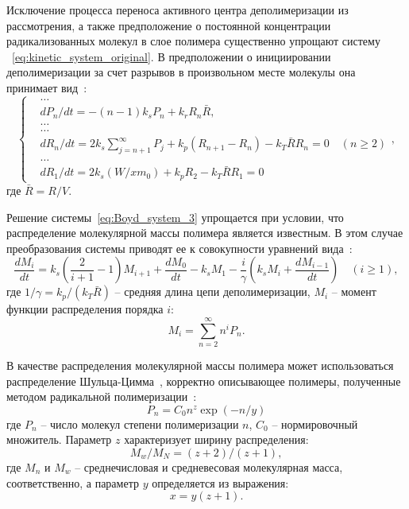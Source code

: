 Исключение процесса переноса активного центра деполимеризации из рассмотрения, а также предположение о постоянной концентрации радикализованных молекул в слое полимера существенно упрощают систему ~\ref{eq:kinetic_system_original}. В предположении о инициировании деполимеризации за счет разрывов в произвольном месте молекулы она принимает вид~\cite{Boyd_3}:
\begin{equation} \label{eq:Boyd_system_3}
	\left\{
	\begin{aligned}
		&\dots \\
		&d P_n / d t=-(n-1) k_s P_n+k_r R_n \bar{R}, \\
		&\dots \\
		&\dots \\
		&d R_n / d t=2 k_s \sum_{j=n+1}^{\infty} P_j+k_p\left(R_{n+1}-R_n\right)-k_T \bar{R} R_n=0 \quad(n \geq 2) \\
		&\dots \\
		&d R_1 / d t=2 k_s\left(W / x m_0\right)+k_p R_2-k_T \bar{R} R_1=0
	\end{aligned}
	\right.,
\end{equation}
где $\bar{R} = R/V$.

Решение системы~\ref{eq:Boyd_system_3} упрощается при условии, что распределение молекулярной массы полимера является известным. В этом случае преобразования системы приводят ее к совокупности уравнений вида~\cite{Boyd_3}:
\begin{equation} \label{eq:moment_equation}
	\frac{d M_i}{d t}=k_s\left(\frac{2}{i+1}-1\right) M_{i+1}+\frac{d M_0}{d t}-k_s M_1 - \frac{i}{\gamma}\left(k_s M_i+\frac{d M_{i-1}}{d t}\right) \quad(i \geq 1),
\end{equation}
где $1/\gamma = k_p / (k_T \bar{R})$ -- средняя длина цепи деполимеризации, $M_i$ -- момент функции распределения порядка $i$:
\begin{equation}
	M_i=\sum_{n=2}^{\infty} n^i P_n.
\end{equation}

В качестве распределения молекулярной массы полимера может использоваться распределение Шульца-Цимма~\cite{Boyd_3, Schulz-Zimm_distribution}, корректно описывающее полимеры, полученные методом радикальной полимеризации~\cite{Schulz-Zimm_distribution_proof}:
\begin{equation} \label{eq:Schulz-Zimm_distribution}
	P_n = C_0 n^z \exp (-n/y)
\end{equation}
где $P_n$ -- число молекул степени полимеризации $n$, $C_0$ -- нормировочный множитель. Параметр $z$ характеризует ширину распределения:
\begin{equation}
	M_w / M_N=(z+2) /(z+1),
\end{equation}
где $M_n$ и $M_w$ -- среднечисловая и средневесовая молекулярная масса, соответственно, а параметр $y$ определяется из выражения:
\begin{equation}
	x=y(z+1).
\end{equation}

